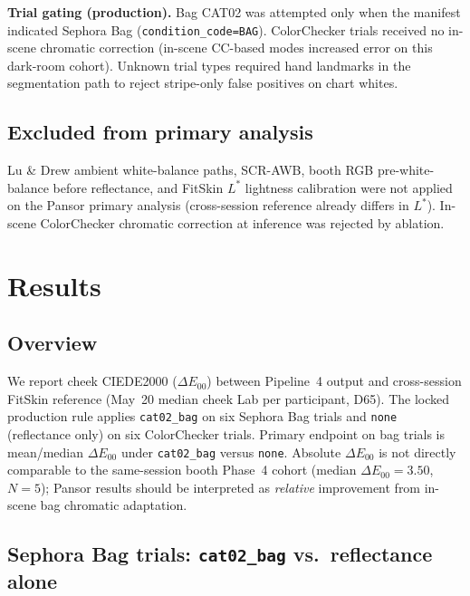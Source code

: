 \documentclass[11pt]{article}
\newcommand{\deee}{\ensuremath{\Delta E_{00}}}
\begin{document}
\textbf{Trial gating (production).} Bag CAT02 was attempted only when the manifest indicated Sephora Bag (\texttt{condition\_code=BAG}). ColorChecker trials received no in-scene chromatic correction (in-scene CC-based modes increased error on this dark-room cohort). Unknown trial types required hand landmarks in the segmentation path to reject stripe-only false positives on chart whites.

\subsection{Excluded from primary analysis}

Lu \& Drew ambient white-balance paths, SCR-AWB, booth RGB pre-white-balance before reflectance, and FitSkin $L^*$ lightness calibration were not applied on the Pansor primary analysis (cross-session reference already differs in $L^*$). In-scene ColorChecker chromatic correction at inference was rejected by ablation.

\section{Results}

\subsection{Overview}

We report cheek CIEDE2000 ($\deee$) between Pipeline~4 output and cross-session FitSkin reference (May~20 median cheek Lab per participant, D65). The locked production rule applies \texttt{cat02\_bag} on six Sephora Bag trials and \texttt{none} (reflectance only) on six ColorChecker trials. Primary endpoint on bag trials is mean/median $\deee$ under \texttt{cat02\_bag} versus \texttt{none}. Absolute $\deee$ is not directly comparable to the same-session booth Phase~4 cohort (median $\deee=3.50$, $N=5$); Pansor results should be interpreted as \emph{relative} improvement from in-scene bag chromatic adaptation.

\subsection{Sephora Bag trials: \texttt{cat02\_bag} vs.\ reflectance alone}
\end{document}
